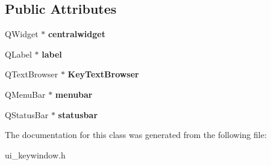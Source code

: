 \subsection*{Public Attributes}
\begin{DoxyCompactItemize}
\item 
\mbox{\label{class_ui__key_window_abad97357738b0be3c671596b28bba4f6}} 
Q\+Widget $\ast$ {\bfseries centralwidget}
\item 
\mbox{\label{class_ui__key_window_a4880621b4256283d264b56f3e708d3f3}} 
Q\+Label $\ast$ {\bfseries label}
\item 
\mbox{\label{class_ui__key_window_a152d41f727469f7d9017eb74bf59b0ef}} 
Q\+Text\+Browser $\ast$ {\bfseries Key\+Text\+Browser}
\item 
\mbox{\label{class_ui__key_window_af30989476960f9b806371ac937cbf795}} 
Q\+Menu\+Bar $\ast$ {\bfseries menubar}
\item 
\mbox{\label{class_ui__key_window_ac0fa3b4c0a116b5d7192915f4abe505b}} 
Q\+Status\+Bar $\ast$ {\bfseries statusbar}
\end{DoxyCompactItemize}


The documentation for this class was generated from the following file\+:\begin{DoxyCompactItemize}
\item 
ui\+\_\+keywindow.\+h\end{DoxyCompactItemize}

